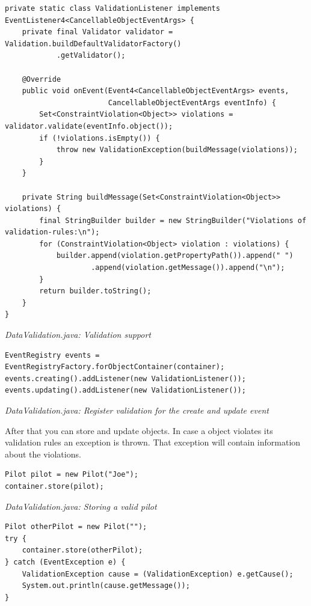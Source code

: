 \begin{lstlisting}
private static class ValidationListener implements EventListener4<CancellableObjectEventArgs> {
    private final Validator validator = Validation.buildDefaultValidatorFactory()
            .getValidator();

    @Override
    public void onEvent(Event4<CancellableObjectEventArgs> events,
                        CancellableObjectEventArgs eventInfo) {
        Set<ConstraintViolation<Object>> violations = validator.validate(eventInfo.object());
        if (!violations.isEmpty()) {
            throw new ValidationException(buildMessage(violations));
        }
    }

    private String buildMessage(Set<ConstraintViolation<Object>> violations) {
        final StringBuilder builder = new StringBuilder("Violations of validation-rules:\n");
        for (ConstraintViolation<Object> violation : violations) {
            builder.append(violation.getPropertyPath()).append(" ")
                    .append(violation.getMessage()).append("\n");
        }
        return builder.toString();
    }
}
\end{lstlisting}

{\small\itshape DataValidation.java: Validation support\par}
\medskip

\begin{lstlisting}
EventRegistry events = EventRegistryFactory.forObjectContainer(container);
events.creating().addListener(new ValidationListener());
events.updating().addListener(new ValidationListener());
\end{lstlisting}

{\small\itshape DataValidation.java: Register validation for the create and update event\par}
\medskip

After that you can store and update objects. In case a object violates its validation rules an exception is thrown. That exception will contain information about the violations.

\begin{lstlisting}
Pilot pilot = new Pilot("Joe");
container.store(pilot);
\end{lstlisting}

{\small\itshape DataValidation.java: Storing a valid pilot\par}
\medskip

\begin{lstlisting}
Pilot otherPilot = new Pilot("");
try {
    container.store(otherPilot);
} catch (EventException e) {
    ValidationException cause = (ValidationException) e.getCause();
    System.out.println(cause.getMessage());
}
\end{lstlisting}

